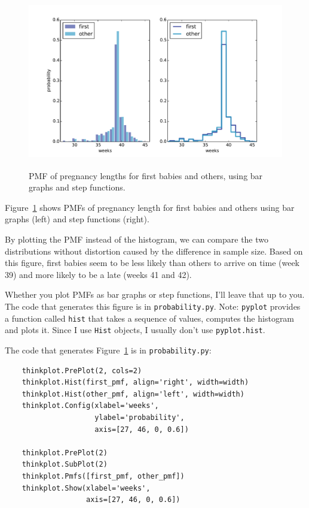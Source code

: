 \documentclass[12pt]{book}
\begin{document}
\begin{figure}
\centerline{\includegraphics[height=3.0in]{figs/probability_nsfg_pmf.pdf}}
\caption{PMF of pregnancy lengths for first babies and others, using
  bar graphs and step functions.}
\label{probability_nsfg_pmf}
\end{figure}

Figure~\ref{probability_nsfg_pmf} shows PMFs of pregnancy length for
first babies and others using bar graphs (left) and step functions
(right).

By plotting the PMF instead of the histogram, we can compare the two
distributions without distortion caused by the difference in sample
size.  Based on this figure, first babies seem to be less likely than
others to arrive on time (week 39) and more likely to be a late (weeks
41 and 42).

Whether you plot PMFs as bar graphs or step functions, I'll leave
that up to you.
The code that generates this figure is in {\tt probability.py}.
Note: {\tt pyplot} provides a function called {\tt hist} that
takes a sequence of values, computes the histogram and plots it.
Since I use {\tt Hist} objects, I usually don't use {\tt pyplot.hist}.

The code that generates Figure~\ref{probability_nsfg_pmf} is in
{\tt probability.py}:

\begin{verbatim}
    thinkplot.PrePlot(2, cols=2)
    thinkplot.Hist(first_pmf, align='right', width=width)
    thinkplot.Hist(other_pmf, align='left', width=width)
    thinkplot.Config(xlabel='weeks',
                     ylabel='probability',
                     axis=[27, 46, 0, 0.6])

    thinkplot.PrePlot(2)
    thinkplot.SubPlot(2)
    thinkplot.Pmfs([first_pmf, other_pmf])
    thinkplot.Show(xlabel='weeks',
                   axis=[27, 46, 0, 0.6])
\end{verbatim}
\end{document}
